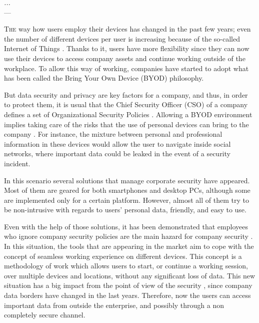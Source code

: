 \label{chap:byodSotA} 

\begin{flushright}{\slshape
   ... } \\ \medskip
    --- {}
\end{flushright}

\minitoc\mtcskip
\vfill

\lettrine{T}{he} way how users employ their devices has changed in the past few years; even the number of different devices per user is increasing because of the so-called Internet of Things \cite{weber2010internet}. Thanks to it, users have more flexibility since they can now use their devices to access company assets and continue working outside of the workplace. To allow this way of working, companies have started to adopt what has been called the Bring Your Own Device (BYOD) philosophy.

But data security and privacy are key factors for a company, and thus, in order to protect them, it is usual that the Chief Security Officer (CSO) of a company defines a set of Organizational Security Policies \cite{Opp_Security11}. Allowing a BYOD environment implies taking care of the risks that the use of personal devices can bring to
the company \cite{gangula2013survey}. For instance, the mixture between personal and professional information in these devices would allow the user to navigate inside social networks, where important data could be leaked in the event of a security incident.  

In this scenario several solutions that manage corporate security have appeared. Most of them are geared for both smartphones and desktop PCs, although some are implemented only for a certain platform. However, almost all of them try to be non-intrusive with regards to users' personal data, friendly, and easy to use.

Even with the help of those solutions, it has been demonstrated that employees who ignore company security policies are the main hazard for company security \cite{Adams_Users05}. In this situation, the tools that are appearing in the market aim to cope with the concept of seamless working experience on different devices. This concept is a methodology of work which allows users to start, or continue a working session, over multiple devices and locations, without any significant loss of data. This new situation has a big impact from the point of view of the security \cite{Schu_SecPatterns05}, since company data borders have changed in the last years. Therefore, now the users can access important data from outside the enterprise, and possibly through a non completely secure channel.


